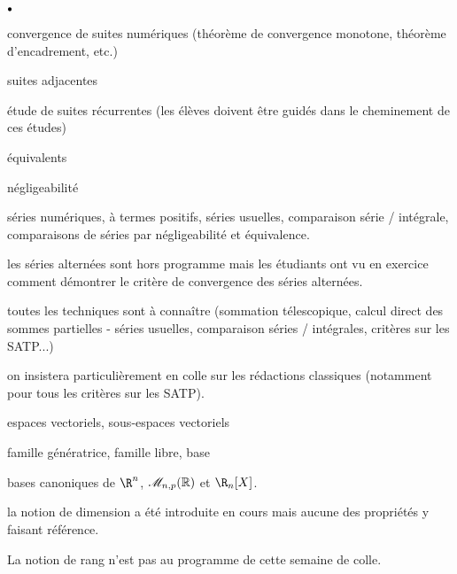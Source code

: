 \documentclass[11pt]{article}%
\begin{document}
\begin{noliste}{$\scriptstyle \bullet$}
\item convergence de suites numériques (théorème de convergence 
monotone, théorème d'encadrement, etc.)
\item suites adjacentes
\item étude de suites récurrentes (les élèves doivent être guidés dans 
le cheminement de ces études)
\item équivalents
\item négligeabilité
\item séries numériques, à termes positifs, séries usuelles, 
comparaison 
série / intégrale, comparaisons de séries par négligeabilité et 
équivalence.
\item les séries alternées sont hors programme mais les étudiants ont 
vu 
en exercice comment démontrer le critère de convergence des séries 
alternées.
\item toutes les techniques sont à connaître (sommation télescopique, 
calcul direct des sommes partielles - séries usuelles, comparaison 
séries / intégrales, critères sur les SATP...)
\item on insistera particulièrement en colle sur les rédactions 
classiques (notamment pour tous les critères sur les SATP).
\item espaces vectoriels, sous-espaces vectoriels
\item famille génératrice, famille libre, base
\item bases canoniques de $\R^n$, $\mathscr{M}_{n,p}(\mathbb{R})$ et $\R_n[X]$.
\item la notion de dimension a été introduite en cours 
mais aucune des propriétés y faisant référence.
\item La notion de rang n'est pas au programme de cette semaine de 
colle.
\end{noliste}
\end{document}

